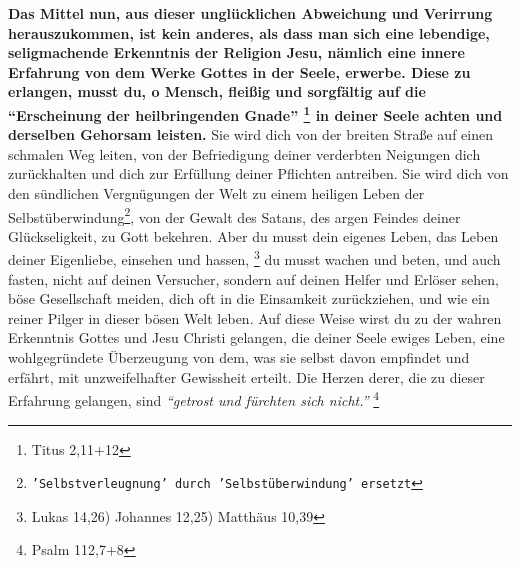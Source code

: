 \textbf{Das Mittel nun, aus dieser unglücklichen Abweichung und Verirrung
herauszukommen,
ist kein anderes, als dass man sich eine lebendige, seligmachende Erkenntnis der
Religion Jesu, nämlich eine innere Erfahrung von dem
Werke Gottes in der Seele,
erwerbe. Diese zu erlangen, musst du, o Mensch, fleißig und sorgfältig auf die
"`Erscheinung der heilbringenden Gnade"'
\footnote{Titus 2,11+12}
in deiner Seele
achten und derselben Gehorsam leisten.} Sie wird dich von der breiten Straße auf
einen schmalen Weg leiten, von der Befriedigung deiner verderbten Neigungen dich
zurückhalten und dich zur Erfüllung deiner Pflichten antreiben.
Sie wird dich
von den sündlichen Vergnügungen der Welt zu einem
heiligen Leben der
Selbstüberwindung\footnote{\texttt{'Selbstverleugnung' durch 'Selbstüberwindung'
ersetzt}}, von der Gewalt des Satans, des argen Feindes
deiner
Glückseligkeit, zu Gott bekehren. Aber du musst dein
eigenes Leben, das Leben
deiner Eigenliebe, einsehen und hassen,
\footnote{Lukas 14,26) Johannes 12,25) Matthäus 10,39}
du musst wachen und beten, und auch fasten, nicht auf
deinen Versucher,
sondern auf deinen Helfer und Erlöser sehen, böse
Gesellschaft meiden, dich oft
in die Einsamkeit zurückziehen, und wie ein reiner
Pilger in dieser bösen Welt
leben. Auf diese Weise wirst du zu der wahren Erkenntnis
Gottes und Jesu Christi
gelangen, die deiner Seele ewiges Leben, eine wohlgegründete
Überzeugung von
dem, was sie selbst davon empfindet und erfährt, mit unzweifelhafter Gewissheit
erteilt. Die Herzen derer, die zu dieser Erfahrung gelangen, sind
\textit{"`getrost und fürchten sich nicht."'}
\footnote{Psalm 112,7+8}

